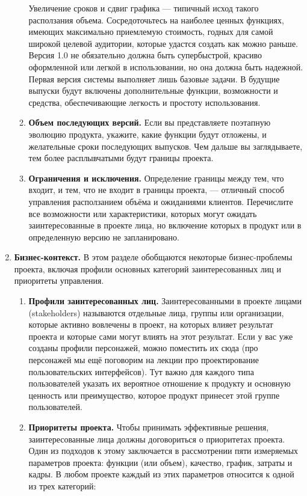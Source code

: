 \documentclass{../../text-style}
\begin{document}
\begin{enumerate}
\begin{enumerate}
        Увеличение сроков и сдвиг графика --- типичный исход такого расползания объема. Сосредоточьтесь на наиболее ценных функциях, имеющих максимально приемлемую стоимость, годных для самой широкой целевой аудитории, которые удастся создать как можно раньше. Версия 1.0 не обязательно должна быть супербыстрой, красиво оформленной или легкой в использовании, но она должна быть надежной. Первая версия системы выполняет лишь базовые задачи. В будущие выпуски будут включены дополнительные функции, возможности и средства, обеспечивающие легкость и простоту использования.
        \item \textbf{Объем последующих версий.} Если вы представляете поэтапную эволюцию продукта, укажите, какие функции будут отложены, и желательные сроки последующих выпусков. Чем дальше вы заглядываете, тем более расплывчатыми будут границы проекта.
        \item \textbf{Ограничения и исключения.} Определение границы между тем, что входит, и тем, что не входит в границы проекта, --- отличный способ управления расползанием объёма и ожиданиями клиентов. Перечислите все возможности или характеристики, которых могут ожидать заинтересованные в проекте лица, но включение которых в продукт или в определенную версию не запланировано.
    \end{enumerate}
    \item \textbf{Бизнес-контекст.} В этом разделе обобщаются некоторые бизнес-проблемы проекта, включая профили основных категорий заинтересованных лиц и приоритеты управления.
    \begin{enumerate}
        \item \textbf{Профили заинтересованных лиц.} Заинтересованными в проекте лицами (stakeholders) называются отдельные лица, группы или организации, которые активно вовлечены в проект, на которых влияет результат проекта и которые сами могут влиять на этот результат. Если у вас уже созданы профили персонажей, можно поместить их сюда (про персонажей мы ещё поговорим на лекции про проектирование пользовательских интерфейсов). Тут важно для каждого типа пользователей указать их вероятное отношение к продукту и основную ценность или преимущество, которое продукт принесет этой группе пользователей.
        \item \textbf{Приоритеты проекта.} Чтобы принимать эффективные решения, заинтересованные лица должны договориться о приоритетах проекта. Один из подходов к этому заключается в рассмотрении пяти измеряемых параметров проекта: функции (или объем), качество, график, затраты и кадры. В любом проекте каждый из этих параметров относится к одной из трех категорий:

\end{enumerate}
\end{enumerate}
\end{document}
